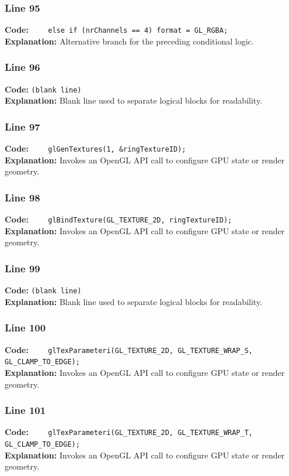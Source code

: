 \documentclass[11pt,a4paper]{article}
\begin{document}
\subsubsection*{Line 95}
\textbf{Code:} \verb|    else if (nrChannels == 4) format = GL_RGBA;|\\
\textbf{Explanation:} Alternative branch for the preceding conditional logic.

\subsubsection*{Line 96}
\textbf{Code:} \texttt{(blank line)}\\
\textbf{Explanation:} Blank line used to separate logical blocks for readability.

\subsubsection*{Line 97}
\textbf{Code:} \verb|    glGenTextures(1, &ringTextureID);|\\
\textbf{Explanation:} Invokes an OpenGL API call to configure GPU state or render geometry.

\subsubsection*{Line 98}
\textbf{Code:} \verb|    glBindTexture(GL_TEXTURE_2D, ringTextureID);|\\
\textbf{Explanation:} Invokes an OpenGL API call to configure GPU state or render geometry.

\subsubsection*{Line 99}
\textbf{Code:} \texttt{(blank line)}\\
\textbf{Explanation:} Blank line used to separate logical blocks for readability.

\subsubsection*{Line 100}
\textbf{Code:} \verb|    glTexParameteri(GL_TEXTURE_2D, GL_TEXTURE_WRAP_S, GL_CLAMP_TO_EDGE);|\\
\textbf{Explanation:} Invokes an OpenGL API call to configure GPU state or render geometry.

\subsubsection*{Line 101}
\textbf{Code:} \verb|    glTexParameteri(GL_TEXTURE_2D, GL_TEXTURE_WRAP_T, GL_CLAMP_TO_EDGE);|\\
\textbf{Explanation:} Invokes an OpenGL API call to configure GPU state or render geometry.
\end{document}
